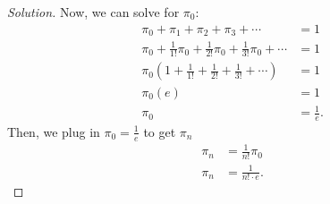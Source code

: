 \documentclass{article}
\begin{document}
\begin{proof}[Solution]
    Now, we can solve for $\pi_0$:
    \begin{align*}
        \pi_0 + \pi_1 + \pi_2 + \pi_3 + \cdots & = 1 \\
        \pi_0 + \frac{1}{1!}\pi_0 + \frac{1}{2!}\pi_0 + \frac{1}{3!}\pi_0 + \cdots & = 1 \\
        \pi_0\left(1 + \frac{1}{1!} + \frac{1}{2!} + \frac{1}{3!} + \cdots\right) & = 1 \\
        \pi_0\left(e\right) & = 1 \\
        \pi_0 & = \frac{1}{e}.
    \end{align*}
    Then, we plug in $\pi_0 = \frac{1}{e}$ to get $\pi_n$
    \begin{align*}
        \pi_n & = \frac{1}{n!}\pi_0 \\
        \pi_n & = \frac{1}{n!\cdot e}.
    \end{align*}
\end{proof}
\bigbreak
\end{document}
